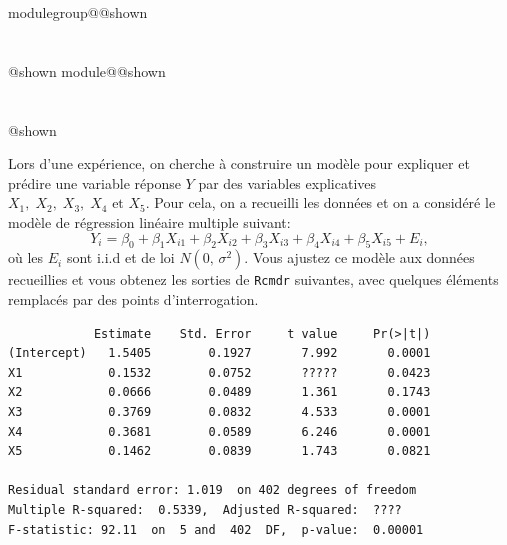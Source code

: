 \documentclass{Evaluation}
\makeatletter
\newcommand{\currentmodulekey}{}
\newcommand{\currentmoduletitle}{}
\newcommand{\currentgroupkey}{}
\newcommand{\currentgrouptitle}{}
\newcommand{\showmoduleifneeded}{%
  \ifx\currentgroupkey\empty\else
    \expandafter\ifx\csname modulegroup@\currentgroupkey @shown\endcsname\relax
      \section*{\currentgrouptitle}%
      \expandafter\gdef\csname modulegroup@\currentgroupkey @shown\endcsname{1}%
    \fi
  \fi
  \expandafter\ifx\csname module@\currentmodulekey @shown\endcsname\relax
    \section*{\currentmoduletitle}%
    \expandafter\gdef\csname module@\currentmodulekey @shown\endcsname{1}%
  \fi
}
\newenvironment{A24}{\showmoduleifneeded}{}
\makeatother
\begin{document}
\begin{questions}
\begin{A24}
\question {} %
Lors d'une expérience, on cherche à construire un modèle pour expliquer et prédire une variable réponse $Y$ par des variables explicatives $X_1,\; X_2,\; X_3,\; X_4 \text{ et } X_5$. Pour cela, on a recueilli les données et on a considéré le modèle de régression linéaire multiple suivant:
$$Y_i=\beta_0+\beta_1X_{i1}+\beta_2X_{i2}+\beta_3X_{i3}+\beta_4X_{i4}+\beta_5X_{i5}+E_i,$$
où les $E_i$ sont  i.i.d et  de loi $N(0,\,\sigma^2).$
Vous ajustez ce modèle aux données recueillies et vous obtenez les sorties de \texttt{Rcmdr} suivantes, avec quelques éléments remplacés par des points d'interrogation.

\begin{verbatim}
            Estimate    Std. Error     t value     Pr(>|t|)
(Intercept)   1.5405        0.1927       7.992       0.0001
X1            0.1532        0.0752       ?????       0.0423
X2            0.0666        0.0489       1.361       0.1743
X3            0.3769        0.0832       4.533       0.0001
X4            0.3681        0.0589       6.246       0.0001
X5            0.1462        0.0839       1.743       0.0821

Residual standard error: 1.019  on 402 degrees of freedom
Multiple R-squared:  0.5339,  Adjusted R-squared:  ????
F-statistic: 92.11  on  5 and  402  DF,  p-value:  0.00001
\end{verbatim}

\end{A24}
\end{questions}
\end{document}
